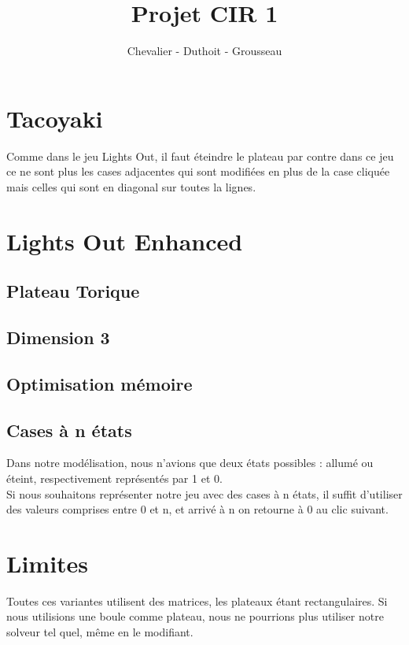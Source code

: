 \documentclass[12pt,a4paper]{article}
\title{Projet CIR 1}
\author{Chevalier - Duthoit - Grousseau}
\date{}
\begin{document}
\maketitle
\section{Tacoyaki}
Comme dans le jeu Lights Out, il faut éteindre le plateau par contre dans ce jeu ce ne sont plus les cases adjacentes qui sont modifiées en plus de la case cliquée mais celles qui sont en diagonal sur toutes la lignes.
\section{Lights Out Enhanced}
\subsection{Plateau Torique}

\subsection{Dimension 3}

\subsection{Optimisation mémoire}

\subsection{Cases à n états}
Dans notre modélisation, nous n'avions que deux états possibles : allumé ou éteint, respectivement représentés par 1 et 0. \\
Si nous souhaitons représenter notre jeu avec des cases à n états, il suffit d'utiliser des valeurs comprises entre 0 et n, et arrivé à n on retourne à 0 au clic suivant.
\section{Limites}
Toutes ces variantes utilisent des matrices, les plateaux étant rectangulaires. Si nous utilisions une boule comme plateau, nous ne pourrions plus utiliser notre solveur tel quel, même en le modifiant.
\end{document}
